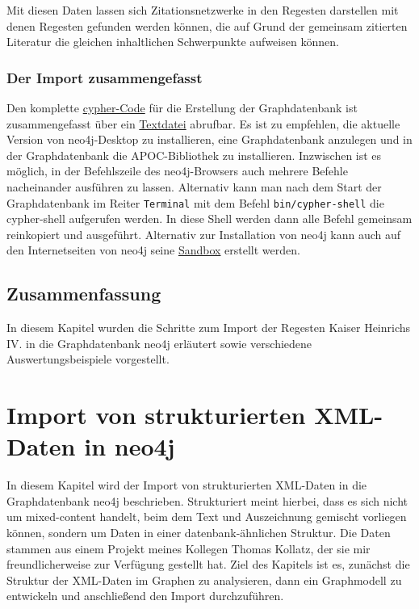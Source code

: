 \documentclass[ngerman,]{scrreprt}
\begin{document}
Mit diesen Daten lassen sich Zitationsnetzwerke in den Regesten darstellen mit denen Regesten gefunden werden können, die auf Grund der gemeinsam zitierten Literatur die gleichen inhaltlichen Schwerpunkte aufweisen können.

\subsection{Der Import zusammengefasst}\label{der-import-zusammengefasst}

Den komplette \href{cypher/20_cypher-Datenbankerstellung.txt}{cypher-Code} für die Erstellung der Graphdatenbank ist zusammengefasst über ein \href{cypher/20_cypher-Datenbankerstellung.txt}{Textdatei} abrufbar. Es ist zu empfehlen, die aktuelle Version von neo4j-Desktop zu installieren, eine Graphdatenbank anzulegen und in der Graphdatenbank die APOC-Bibliothek zu installieren. Inzwischen ist es möglich, in der Befehlszeile des neo4j-Browsers auch mehrere Befehle nacheinander ausführen zu lassen. Alternativ kann man nach dem Start der Graphdatenbank im Reiter \texttt{Terminal} mit dem Befehl \texttt{bin/cypher-shell} die cypher-shell aufgerufen werden. In diese Shell werden dann alle Befehl gemeinsam reinkopiert und ausgeführt. Alternativ zur Installation von neo4j kann auch auf den Internetseiten von neo4j seine \href{https://neo4j.com/lp/try-neo4j-sandbox}{Sandbox} erstellt werden.

\section{Zusammenfassung}\label{zusammenfassung-1}

In diesem Kapitel wurden die Schritte zum Import der Regesten Kaiser Heinrichs IV. in die Graphdatenbank neo4j erläutert sowie verschiedene Auswertungsbeispiele vorgestellt.

\chapter{Import von strukturierten XML-Daten in neo4j}\label{import-von-strukturierten-xml-daten-in-neo4j}

In diesem Kapitel wird der Import von strukturierten XML-Daten in die Graphdatenbank neo4j beschrieben. Strukturiert meint hierbei, dass es sich nicht um mixed-content handelt, beim dem Text und Auszeichnung gemischt vorliegen können, sondern um Daten in einer datenbank-ähnlichen Struktur. Die Daten stammen aus einem Projekt meines Kollegen Thomas Kollatz, der sie mir freundlicherweise zur Verfügung gestellt hat. Ziel des Kapitels ist es, zunächst die Struktur der XML-Daten im Graphen zu analysieren, dann ein Graphmodell zu entwickeln und anschließend den Import durchzuführen.
\end{document}
